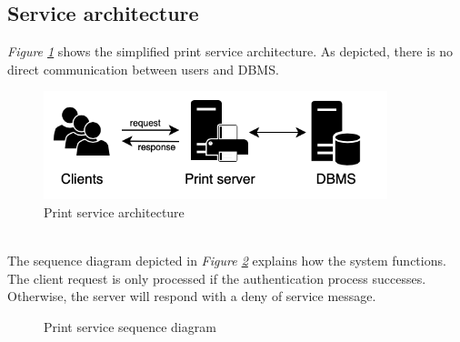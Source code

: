 \subsection{Service architecture}
\textit{Figure \ref{fig:arch}} shows the simplified print service architecture. As depicted, there is no direct communication between users and DBMS.\\
\begin{figure}[hb]
	\centering
	\includegraphics[width=10cm]{images/architecture}
	\caption{Print service architecture}
	\label{fig:arch}
\end{figure}
\\The sequence diagram depicted in \textit{Figure \ref{fig:seqdiag}} explains how the system functions. The client request is only processed if the authentication process successes. Otherwise, the server will respond with a deny of service message.
\begin{figure}[h]
	\centering	
	
	\caption{Print service sequence diagram}
	\label{fig:seqdiag}
\end{figure}
